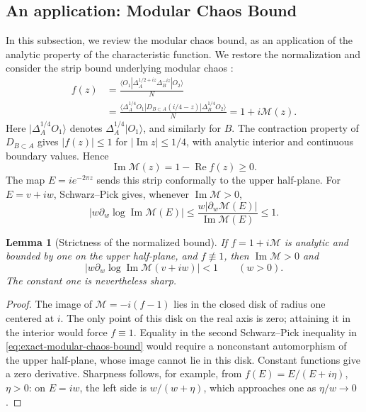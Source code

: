 \documentclass[a4paper,11pt]{article}
\newtheorem{lemma}[theorem]{Lemma}
\theoremstyle{definition}
\begin{document}
\subsection{An application: Modular Chaos Bound}
\label{subsec:modular-chaos-bound}

In this subsection, we review the modular chaos bound, as an application of the analytic property of the characteristic function. We restore the normalization and consider the strip bound underlying modular chaos \cite{deBoerLamprou2020}:
\begin{align}
 f(z)&=\frac{\langle O_1|\Delta_A^{1/2+iz}\Delta_B^{-iz}|O_2\rangle}{N}
 \nonumber\\
 &=\frac{\langle\Delta_A^{1/4}O_1|
          D_{B\subset A}(i/4-z)|\Delta_B^{1/4}O_2\rangle}{N}
 =1+i\mathcal M(z).
 \label{eq:normalized-characteristic}
\end{align}
Here $|\Delta_A^{1/4}O_1\rangle$ denotes $\Delta_A^{1/4}|O_1\rangle$, and similarly for $B$. The contraction property of $D_{B\subset A}$ gives $|f(z)|\leq1$ for $|\operatorname{Im}z|\leq1/4$, with analytic interior and continuous boundary values. Hence
\begin{equation}
 \operatorname{Im}\mathcal M(z)=1-\operatorname{Re}f(z)\geq0.
 \label{eq:positive-imaginary-part}
\end{equation}
The map $E=ie^{-2\pi z}$ sends this strip conformally to the upper half-plane. For $E=v+iw$, Schwarz--Pick gives, whenever $\operatorname{Im}\mathcal M>0$,
\begin{equation}
 \left|w\partial_w\log\operatorname{Im}\mathcal M(E)\right|
 \leq\frac{w|\partial_w\mathcal M(E)|}{\operatorname{Im}\mathcal M(E)}
 \leq1.
 \label{eq:exact-modular-chaos-bound}
\end{equation}

\begin{lemma}[Strictness of the normalized bound]
\label{lem:strict-modular-chaos-bound}
If $f=1+i\mathcal M$ is analytic and bounded by one on the upper half-plane, and $f\not\equiv1$, then $\operatorname{Im}\mathcal M>0$ and
\begin{equation}
 \left|w\partial_w\log\operatorname{Im}\mathcal M(v+iw)\right|<1
 \qquad(w>0).
 \label{eq:strict-modular-chaos-bound}
\end{equation}
The constant one is nevertheless sharp.
\end{lemma}
\begin{proof}
The image of $\mathcal M=-i(f-1)$ lies in the closed disk of radius one centered at $i$. The only point of this disk on the real axis is zero; attaining it in the interior would force $f\equiv1$. Equality in the second Schwarz--Pick inequality in \eqref{eq:exact-modular-chaos-bound} would require a nonconstant automorphism of the upper half-plane, whose image cannot lie in this disk. Constant functions give a zero derivative. Sharpness follows, for example, from $f(E)=E/(E+i\eta)$, $\eta>0$: on $E=iw$, the left side is $w/(w+\eta)$, which approaches one as $\eta/w\to0$.
\end{proof}
\end{document}
